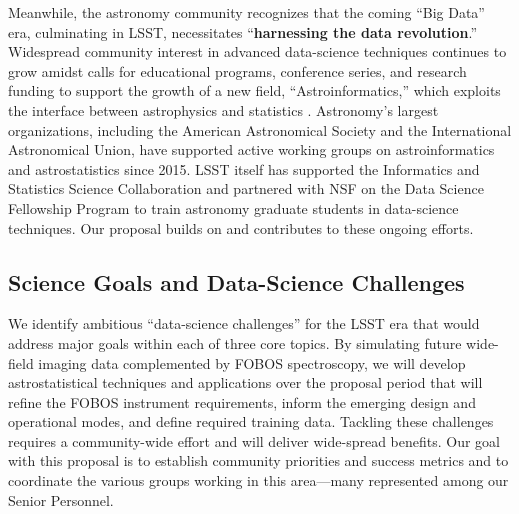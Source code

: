 \documentclass[oneside,11pt]{amsart}
\newcommand{\comment}[2][todo]{{\color{#1}[[{\bf #2}]]}}
\begin{document}
Meanwhile, the astronomy community recognizes that the coming ``Big
Data'' era, culminating in LSST, necessitates ``\textbf{harnessing the
data revolution}.''  Widespread community interest in advanced
data-science techniques continues to grow amidst calls for educational
programs, conference series, and research funding to support the growth
of a new field, ``Astroinformatics,'' which exploits the interface
between astrophysics and statistics \citep{borne09}.  Astronomy's
largest organizations, including the American Astronomical Society and
the International Astronomical Union, have supported active working
groups on astroinformatics and astrostatistics since 2015.  LSST itself
has supported the Informatics and Statistics Science Collaboration and
partnered with NSF on the Data Science Fellowship Program to train
astronomy graduate students in data-science techniques.  Our proposal
builds on and contributes to these ongoing efforts.

\subsection{Science Goals and Data-Science Challenges}
\label{sec:goals}

We identify ambitious ``data-science challenges'' for the LSST era that
would address major goals within each of three core topics.  By
simulating future wide-field imaging data complemented by FOBOS spectroscopy,
we will develop astrostatistical techniques and applications over the
proposal period that will refine the FOBOS instrument requirements,
inform the emerging design and operational modes, and define required
training data.  Tackling these challenges requires a community-wide
effort and will deliver wide-spread benefits.  Our goal with this
proposal is to establish community priorities and success metrics and to
coordinate the various groups working in this area---many represented
among our Senior Personnel.

\end{document}
